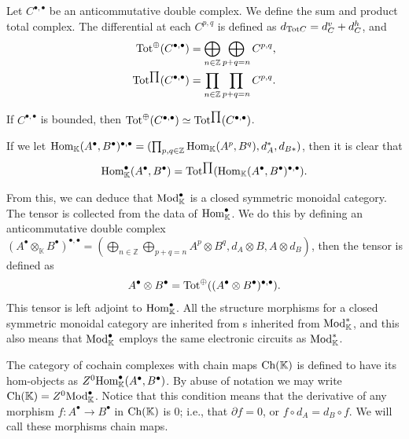 \documentclass[../thesis.tex]{subfiles}
\begin{document}
            \begin{definition}
                Let $C^{\bullet, \bullet}$ be an anticommutative double complex. We define the sum and product total complex. The differential at each $C^{p,q}$ is defined as $d_{\tt{Tot}C} = d^v_C + d^h_C$, and
                \begin{align*}
                    \tt{Tot}^{\oplus}(C^{\bullet, \bullet}) & = \bigoplus_{n\in\mathbb{Z}}\bigoplus_{p+q=n}C^{p,q}\tt{,} \\
                    \tt{Tot}^{\prod}(C^{\bullet, \bullet}) & = \prod_{n\in \mathbb{Z}}\prod_{p+q=n}C^{p,q}\tt{.}
                \end{align*}
            \end{definition}
            
            If $C^{\bullet, \bullet}$ is bounded, then $\tt{Tot}^\oplus(C^{\bullet, \bullet}) \simeq \tt{Tot}^{\prod}(C^{\bullet, \bullet})$.

            If we let $\tt{Hom}_\mathbb{K}(A^\bullet, B^\bullet)^{\bullet, \bullet} = (\prod_{p,q\in\mathbb{Z}}\tt{Hom}_\mathbb{K}(A^p,B^q), d_A^*, d_{B*})$, then it is clear that
            \begin{align*}
                \tt{Hom}_\mathbb{K}^\bullet(A^\bullet,B^\bullet) = \tt{Tot}^{\prod}(\tt{Hom}_\mathbb{K}(A^\bullet, B^\bullet)^{\bullet, \bullet})\tt{.}
            \end{align*}

            From this, we can deduce that $\tt{Mod}_\mathbb{K}^\bullet$ is a closed symmetric monoidal category. The tensor is collected from the data of $\tt{Hom}_\mathbb{K}^\bullet$. We do this by defining an anticommutative double complex $(A^\bullet \otimes_\mathbb{K} B^\bullet)^{\bullet, \bullet} = (\bigoplus_{n\in\mathbb{Z}}\bigoplus_{p+q=n}A^p\otimes B^q, d_A\otimes B,A\otimes d_B)$, then the tensor is defined as
            \begin{align*}
                A^\bullet \otimes B^\bullet = \tt{Tot}^\oplus((A^\bullet \otimes B^\bullet)^{\bullet, \bullet})\tt{.}
            \end{align*}
            This tensor is left adjoint to $\tt{Hom}_\mathbb{K}^\bullet$. All the structure morphisms for a closed symmetric monoidal category are inherited from
            s inherited from $\tt{Mod}_\mathbb{K}^*$, and this also means that $\tt{Mod}_\mathbb{K}^\bullet$ employs the same electronic circuits as $\tt{Mod}_\mathbb{K}^*$.

            The category of cochain complexes with chain maps $\tt{Ch}(\mathbb{K})$ is defined to have its hom-objects as $Z^0\tt{Hom}_\mathbb{K}^\bullet(A^\bullet, B^\bullet)$. By abuse of notation we may write $\tt{Ch}(\mathbb{K}) = Z^0\tt{Mod}_\mathbb{K}^\bullet$. Notice that this condition means that the derivative of any morphism $f: A^\bullet \rightarrow B^\bullet$ in $\tt{Ch}(\mathbb{K})$ is $0$; i.e., that $\partial f = 0$, or $f\circ d_A = d_B \circ f$. We will call these morphisms chain maps.
\end{document}
